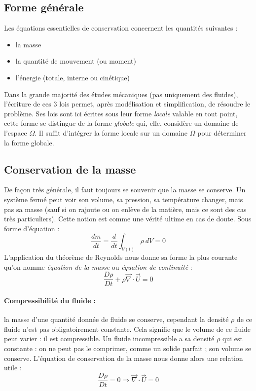 
\subsection{Forme générale}
Les équations essentielles de conservation concernent les quantités suivantes :
%
\begin{itemize}
    \item la masse
    \item la quantité de mouvement (ou moment)
    \item l'énergie (totale, interne ou cinétique)
\end{itemize}

Dans la grande majorité des études mécaniques (pas uniquement des fluides), l'écriture de ces 3 lois permet, après modélisation et simplification, de résoudre le problème. Ses lois sont ici écrites sous leur forme \textit{locale} valable en tout point, cette forme se distingue de la forme \textit{globale} qui, elle, considère un domaine de l'espace $\Omega$. Il suffit d'intégrer la forme locale sur un domaine $\Omega$ pour déterminer la forme globale.


\subsection{Conservation de la masse}
De façon très générale, il faut toujours se souvenir que la masse se conserve. Un système fermé peut voir son volume, sa pression, sa température changer, mais pas sa masse (sauf si on rajoute ou on enlève de la matière, mais ce sont des cas très particuliers). Cette notion est comme une vérité ultime en cas de doute. Sous forme d'équation :
%
\begin{equation}
\frac{dm}{dt} = \frac{d}{dt} \int_{V(t)} {\rho~dV} = 0
\end{equation}
%
L'application du théorème de Reynolds nous donne sa forme la plus courante qu'on nomme \textit{équation de la masse} ou \textit{équation de continuité} :
%
\begin{equation}
\frac {D\rho}{Dt} + \rho \vec{\nabla} \cdot \vec{U} = 0
\label{eq:masse}
\end{equation}
%
\paragraph{Compressibilité du fluide :} la masse d'une quantité donnée de fluide se conserve, cependant la densité $\rho$ de ce fluide n'est pas obligatoirement constante. Cela signifie que le volume de ce fluide peut varier : il est compressible. Un fluide incompressible a sa densité $\rho$ qui est constante : on ne peut pas le comprimer, comme un solide parfait ; son volume se conserve. L'équation de conservation de la masse nous donne alors une relation utile :
%
\begin{equation}
\frac {D\rho}{Dt} = 0 \Rightarrow \vec{\nabla} \cdot \vec{U} = 0
\end{equation}


